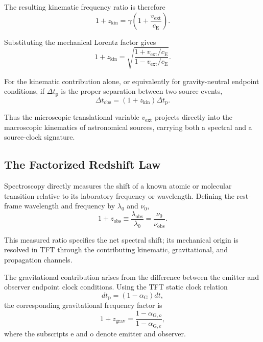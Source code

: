 The resulting kinematic frequency ratio is therefore
\begin{equation}
    1+z_{\mathrm{kin}}
    =
    \gamma
    \left(
        1+\frac{v_{\mathrm{ext}}}{c_{\mathrm E}}
    \right).
\end{equation}

Substituting the mechanical Lorentz factor gives
\begin{equation}
    1+z_{\mathrm{kin}}
    =
    \sqrt{
        \frac{
            1+v_{\mathrm{ext}}/c_{\mathrm E}
        }{
            1-v_{\mathrm{ext}}/c_{\mathrm E}
        }
    }.
\end{equation}

For the kinematic contribution alone, or equivalently for gravity-neutral endpoint conditions, if $\Delta t_{\mathrm p}$ is the proper separation between two source events,
\begin{equation}
    \Delta t_{\mathrm{obs}}
    =
    (1+z_{\mathrm{kin}})
    \Delta t_{\mathrm p}.
\end{equation}

Thus the microscopic translational variable $v_{\mathrm{ext}}$ projects directly into the macroscopic kinematics of astronomical sources, carrying both a spectral and a source-clock signature.


\subsection{The Factorized Redshift Law}

Spectroscopy directly measures the shift of a known atomic or molecular transition relative to its laboratory frequency or wavelength. Defining the rest-frame wavelength and frequency by $\lambda_0$ and $\nu_0$,
\begin{equation}
    1+z_{\mathrm{obs}}
    \equiv
    \frac{\lambda_{\mathrm{obs}}}{\lambda_0}
    =
    \frac{\nu_0}{\nu_{\mathrm{obs}}}.
\end{equation}

This measured ratio specifies the net spectral shift; its mechanical origin is resolved in TFT through the contributing kinematic, gravitational, and propagation channels.

The gravitational contribution arises from the difference between the emitter and observer endpoint clock conditions. Using the TFT static clock relation
\begin{equation}
    dt_{\mathrm p}
    =
    (1-\alpha_{\mathrm G})dt,
\end{equation}
the corresponding gravitational frequency factor is
\begin{equation}
    1+z_{\mathrm{grav}}
    =
    \frac{
        1-\alpha_{\mathrm G,o}
    }{
        1-\alpha_{\mathrm G,e}
    },
\end{equation}
where the subscripts $\mathrm e$ and $\mathrm o$ denote emitter and observer.

